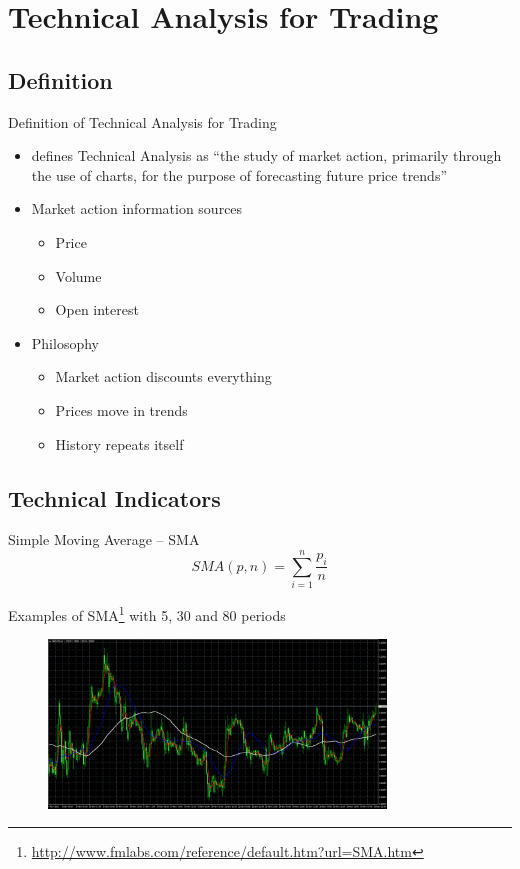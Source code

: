 \documentclass[12pt,portuguese]{beamer}
\begin{document}
\section{Technical Analysis for Trading}
\subsection{Definition}
\begin{frame}{Definition of Technical Analysis for Trading}
\begin{itemize}
	\item \citet{Murphy1999} defines Technical Analysis as ``the study of market action, primarily through the use of charts, for the purpose of forecasting future price trends''

	\item Market action information sources \citep{Murphy1999}
	\begin{itemize}
		\item Price
		\item Volume
		\item Open interest
	\end{itemize}

	\item Philosophy \citep{Murphy1999}
	\begin{itemize}
		\item Market action discounts everything
		\item Prices move in trends
		\item History repeats itself
	\end{itemize}
\end{itemize}
\end{frame}

\subsection{Technical Indicators}
\begin{frame}{Simple Moving Average -- SMA}
	$$SMA(p,n) = \sum_{i=1}^n \frac{p_i}{n}$$

	Examples of SMA\footnote{\url{http://www.fmlabs.com/reference/default.htm?url=SMA.htm}} with 5, 30 and 80 periods
	\begin{figure}[H]
	\centering
	\includegraphics[width=0.8\textwidth]{images/mt4_SMA.png}
	\end{figure}
\end{frame}
\end{document}
